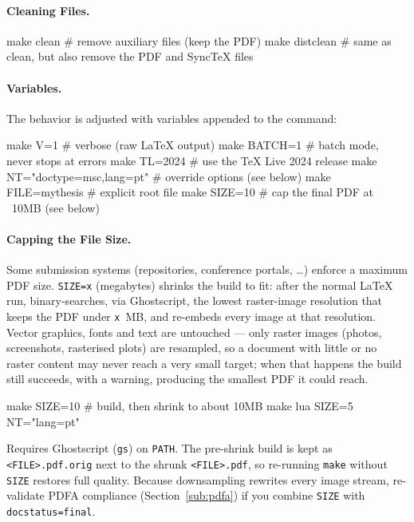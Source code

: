 \paragraph{Cleaning Files.}
\begin{bashcode}
make clean      # remove auxiliary files (keep the PDF)
make distclean  # same as clean, but also remove the PDF and SyncTeX files
\end{bashcode}

\paragraph{Variables.} The behavior is adjusted with variables appended to the command:
\begin{bashcode}
make V=1                        # verbose (raw LaTeX output)
make BATCH=1                    # batch mode, never stops at errors
make TL=2024                    # use the TeX Live 2024 release
make NT="doctype=msc,lang=pt"   # override \ntsetup options (see below)
make FILE=mythesis              # explicit root file
make SIZE=10                    # cap the final PDF at ~10MB (see below)
\end{bashcode}

\paragraph{Capping the File Size.}
\label{sub:make_size}
Some submission systems (repositories, conference portals, \dots) enforce a
maximum \gls{PDF} size. \verb!SIZE=x! (megabytes) shrinks the build to fit:
after the normal \LaTeX{} run, \novathesis{} binary-searches, via
Ghostscript, the lowest raster-image resolution that keeps the \gls{PDF}
under \texttt{x}~MB, and re-embeds every image at that resolution. Vector
graphics, fonts and text are untouched — only raster images (photos,
screenshots, rasterised plots) are resampled, so a document with little or
no raster content may never reach a very small target; when that happens
the build still succeeds, with a warning, producing the smallest \gls{PDF}
it could reach.

\begin{bashcode}
make SIZE=10           # build, then shrink to about 10MB
make lua SIZE=5 NT="lang=pt"
\end{bashcode}

\noindent Requires Ghostscript (\texttt{gs}) on \texttt{PATH}. The
pre-shrink build is kept as \verb!<FILE>.pdf.orig! next to the shrunk
\verb!<FILE>.pdf!, so re-running \texttt{make} without \verb!SIZE! restores
full quality. Because downsampling rewrites every image stream,
re-validate \gls{PDFA} compliance (Section~\ref{sub:pdfa}) if you combine
\verb!SIZE! with \verb!docstatus=final!.

